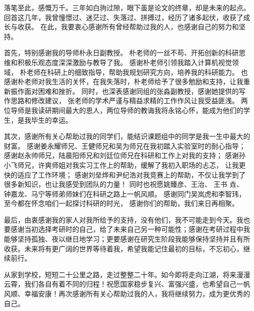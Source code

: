 
\begin{thanks}


落笔至此，感慨万千。三年如白驹过隙，眼下虽是论文的终章，却是未来的起点。
回首这几年，我曾憧憬过、迷茫过、失落过、拼搏过，经历了诸多起伏，收获了成长与收获。
在此，我要衷心感谢所有曾经帮助过我的人，也感谢自己的努力和坚持。


首先，特别感谢我的导师朴永日副教授。
朴老师的一丝不苟、开拓创新的科研思维和积极乐观态度深深激励与教导了我。
感谢朴老师引领我踏入计算机视觉领域，
朴老师在科研上的细致指导，帮助我规划研究方向，培养我的科研能力。
也感谢朴老师对我生活的关怀，在我失落时，朴老师给予了很多勉励和支持，让我重新振作面对困难和挫折。
同时，也深表感谢同组的张淼副教授，感谢她提供的写作思路和修改建议，
张老师的学术严谨与精益求精的工作作风让我受益匪浅。
两位导师是我读研期间最大的恩人，两位导师的教诲我将永铭心怀，能成为他们的学生，是我毕生的幸运。


其次，感谢所有关心帮助过我的同学们，能结识课题组中的同学是我一生中最大的财富。
感谢姜永耀师兄、王健师兄和吴为师兄在我初踏入实验室时的耐心指导；
感谢赵永帅师兄，陆晨阳师兄和刘廷位师兄在科研和工作上对我的支持；
感谢孙小飞师兄，许爽师姐对我实习工作上的帮助，缓解了我初入职场的忐忑，
让我更快的适应了工作环境；
感谢刘垒烨和尹纪浩对我竞赛上的帮助，不仅让我学到了很多新知识，也让我感受到团队的力量！
同时也祝愿姚臻彦、王治、
王书{ 垚}、
钟嘉龙、马宁等师弟师妹们在科研之路上一帆风顺。
感谢同门吴岚虎和李智玮，至今都在怀念咱们一起探讨科研的时光，
感谢你们的帮助，我们来日再相聚。


最后，由衷感谢我的家人对我所给予的支持，没有他们，我不可能走到今天。我也要感谢当初选择考研时的自己，给了未来自己另一种可能性；感谢在考研过程中我能够坚持孤独、夜以继日地学习；更要感谢在研究生阶段我能够保持坚持并且有所收获。未来将有更广阔的世界等待着我，希望我能记住最初的目标，不忘初心，继续前行。


从家到学校，短短二十公里之路，走过整整二十年。如今即将走向江湖，将来漫漫云霄，我们各自有着不同的归程！祝愿国家稳步复兴、富强兴盛，也希望自己一帆风顺、幸福安康！再次感谢所有关心帮助过我的人，我将继续努力，成为更优秀的自己。


%

\end{thanks}

